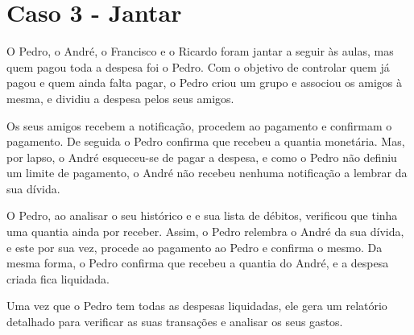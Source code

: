 \section{Caso 3 - Jantar}

O Pedro, o André, o Francisco e o Ricardo foram jantar a seguir às aulas, mas quem pagou toda a despesa foi o Pedro. Com o objetivo de controlar quem já pagou e quem ainda falta pagar, o Pedro criou um grupo e associou os amigos à mesma, e dividiu a despesa pelos seus amigos.

Os seus amigos recebem a notificação, procedem ao pagamento e confirmam o pagamento. De seguida o Pedro confirma que recebeu a quantia monetária. Mas, por lapso, o André esqueceu-se de pagar a despesa, e como o Pedro não definiu um limite de pagamento, o André não recebeu nenhuma notificação a lembrar da sua dívida.

O Pedro, ao analisar o seu histórico e e sua lista de débitos, verificou que tinha uma quantia ainda por receber. Assim, o Pedro relembra o André da sua dívida, e este por sua vez, procede ao pagamento ao Pedro e confirma o mesmo. Da mesma forma, o Pedro confirma que recebeu a quantia do André, e a despesa criada fica liquidada.

Uma vez que o Pedro tem todas as despesas liquidadas, ele gera um relatório detalhado para verificar as suas transações e analisar os seus gastos.